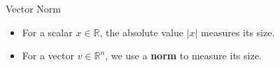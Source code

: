 \documentclass[10pt]{beamer}
\begin{document}
\begin{frame}{Vector Norm}

\begin{itemize}
    \item For a scalar $x\in\mathbb{R}$, the absolute value $|x|$ measures its size.
    \item For a vector $v\in\mathbb{R}^n$, we use a \textbf{norm} to measure its size.
\end{itemize}


\end{frame}
\end{document}
